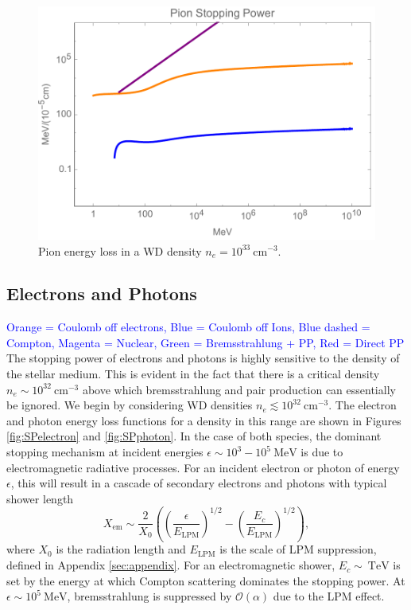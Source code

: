 \documentclass[twocolumn,showpacs,preprintnumbers,amsmath,amssymb,prd]{revtex4}
\newcommand{\OO}{\mathcal{O}}
\def\r{\right)}
\def\l{\left(}
\begin{document}
\begin{figure}
\includegraphics[scale=.45]{SPpion.pdf}
\caption{Pion energy loss in a WD density $n_e = 10^{33} ~\text{cm}^{-3}$.}
\label{fig:SPpion}
\end{figure}

\subsection{Electrons and Photons}
\textcolor{blue}{Orange = Coulomb off electrons, Blue = Coulomb off Ions, Blue dashed = Compton, Magenta = Nuclear, Green = Bremsstrahlung + PP, Red = Direct PP}
The stopping power of electrons and photons is highly sensitive to the density of the stellar medium.
This is evident in the fact that there is a critical density $n_e \sim 10^{32} ~\text{cm}^{-3}$ above which bremsstrahlung and pair production can essentially be ignored.
We begin by considering WD densities $n_e \lesssim 10^{32} ~\text{cm}^{-3}$.
The electron and photon energy loss functions for a density in this range are shown in Figures \ref{fig:SPelectron} and \ref{fig:SPphoton}.
In the case of both species, the dominant stopping mechanism at incident energies $\epsilon \sim 10^{3}-10^{5} ~\text{MeV}$ is due to electromagnetic radiative processes.
For an incident electron or photon of energy $\epsilon$, this will result in a cascade of secondary electrons and photons with typical shower length
\begin{equation}
X_\text{em} \sim \frac{2}{X_0} \l \l \frac{\epsilon}{E_\text{LPM}}\r^{1/2} - \l \frac{E_c}{E_\text{LPM}}\r^{1/2} \r,
\end{equation}
where $X_0$ is the radiation length and $E_\text{LPM}$ is the scale of LPM suppression, defined in Appendix \ref{sec:appendix}.
For an electromagnetic shower, $E_c \sim ~\text{TeV}$ is set by the energy at which Compton scattering dominates the stopping power.
At $\epsilon \sim 10^{5} ~\text{MeV}$, bremsstrahlung is suppressed by $\OO(\alpha)$ due to the LPM effect.
\end{document}
